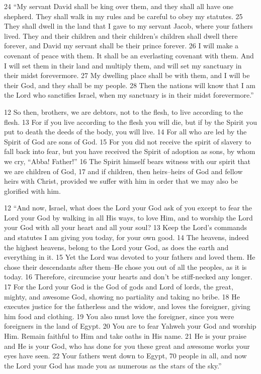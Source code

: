 \begin{bible}
24 ``My servant David shall be king over them, and they shall all have one shepherd. They shall walk in my rules and be careful to obey my statutes. 25 They shall dwell in the land that I gave to my servant Jacob, where your fathers lived. They and their children and their children's children shall dwell there forever, and David my servant shall be their prince forever. 26 I will make a covenant of peace with them. It shall be an everlasting covenant with them. And I will set them in their land and multiply them, and will set my sanctuary in their midst forevermore. 27 My dwelling place shall be with them, and I will be their God, and they shall be my people. 28 Then the nations will know that I am the Lord who sanctifies Israel, when my sanctuary is in their midst forevermore.'' 


12 So then, brothers, we are debtors, not to the flesh, to live according to the flesh. 13 For if you live according to the flesh you will die, but if by the Spirit you put to death the deeds of the body, you will live. 14 For all who are led by the Spirit of God are sons of God. 15 For you did not receive the spirit of slavery to fall back into fear, but you have received the Spirit of adoption as sons, by whom we cry, ``Abba! Father!'' 16 The Spirit himself bears witness with our spirit that we are children of God, 17 and if children, then heirs--heirs of God and fellow heirs with Christ, provided we suffer with him in order that we may also be glorified with him.


12 ``And now, Israel, what does the Lord your God ask of you except to fear the Lord your God by walking in all His ways, to love Him, and to worship the Lord your God with all your heart and all your soul?  13 Keep the Lord's commands and statutes I am giving you today, for your own good.  14 The heavens, indeed the highest heavens, belong to the Lord your God, as does the earth and everything in it.  15 Yet the Lord was devoted to your fathers and loved them. He chose their descendants after them--He chose you out of all the peoples, as it is today.  16 Therefore, circumcise your hearts and don't be stiff-necked any longer.  17 For the Lord your God is the God of gods and Lord of lords, the great, mighty, and awesome God, showing no partiality and taking no bribe.  18 He executes justice for the fatherless and the widow, and loves the foreigner, giving him food and clothing.  19 You also must love the foreigner, since you were foreigners in the land of Egypt.  20 You are to fear Yahweh your God and worship Him. Remain faithful to Him and take oaths in His name.  21 He is your praise and He is your God, who has done for you these great and awesome works your eyes have seen.  22 Your fathers went down to Egypt, 70 people in all, and now the Lord your God has made you as numerous as the stars of the sky.''


\end{bible}

